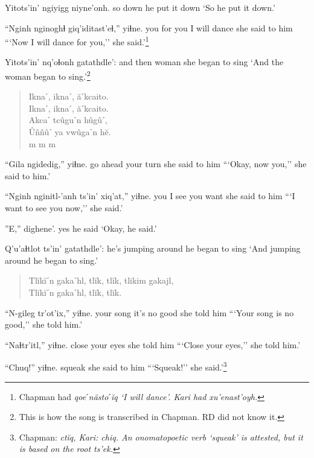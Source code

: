 \documentclass[12pt]{article}
\begin{document}
\gll Yitots'in' ngiyigg niyne'onh.
so  down  {he put it down}
\glt `So he put it down.'
\glend

\gll ``Nginh nginoghɬ giq'iditast'eɬ,'' yiɬne.
you  {for you}  {I will dance} {she said to him}
\glt ```Now I will dance for you,'' she said.'\footnote{Chapman had \em qoeˊn\"astoˊ\u{i}q \em `I will dance'. Kari had \em xu'enast'oyh.}
\glend

\gll Yitots'in' nq'oɬonh gatathdle':
{and then} woman  {she began to sing}
\glt `And the woman began to sing.'\footnote{This is how the song is transcribed in Chapman. RD did not know it.}
\glend 

\begin{verse}
 Iknaˊ, iknaˊ, \u{a}ˊkcaito.\\
 Iknaˊ, iknaˊ, \u{a}ˊkcaito.\\
 Akcaˊ tc\^uguˊn h\^ug\^uˊ,\\
 \^U\~n\~n\^uˊ ya vw\^ugaˊn h\u{e}.\\
            m  m  m\\
\end{verse}

\gll ``Gila ngidedig,'' yiɬne.
{go ahead}  {your turn} {she said to him}
\glt ```Okay, now you,'' she said to him.'
\glend

\gll ``Nginh nginitl-'anh ts'in' xiq'at,'' yiɬne.
you  {I see you} {} want  {she said to him}
\glt ```I want to see you now,'' she said.'
\glend

\gll ''E,'' dighene'.
yes  {he said}
\glt `Okay, he said.'
\glend

\gll Q'u'aɬtlot ts'in' gatathdle':
{he's jumping around} {} {he began to sing }
\glt `And jumping around he began to sing.'
\glend 

\begin{verse}
 Tl\u{i}k\u{i}ˊn gakaˊhl, tl\u{i}k, tl\u{i}k, tlikim gakajl,\\
 Tl\u{i}k\u{i}ˊn gakaˊhl, tl\u{i}k, tl\u{i}k.\\
\end{verse}

\gll ``N-gileg tr'ot'ix,'' yiɬne.
{your song} {it's no good} {she told him}
\glt ```Your song is no good,'' she told him.'
\glend

\gll ``Naɬtr'itl,''  yiɬne.
{close your eyes} {she told him}
\glt ```Close your eyes,'' she told him.'
\glend

\gll ``Chuq!'' yiɬne.
squeak  {she said to him}
\glt ```Squeak!'' she said.'\footnote{Chapman:  \em ct\u{i}q\em , Kari: \em chiq. \em An onomatopoetic verb `squeak' is attested, but it is based on the root \em ts'ek.}
\glend
\end{document}
